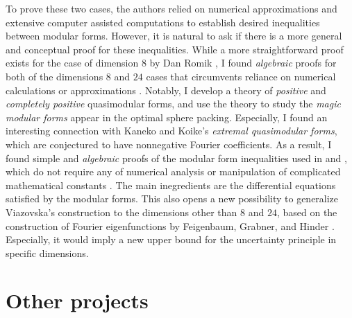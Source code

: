 \documentclass[12pt]{article}
\begin{document}
To prove these two cases, the authors \cite{viazovska2017sphere,cohn2017sphere} relied on numerical approximations and extensive computer assisted computations to establish desired inequalities between modular forms. However, it is natural to ask if there is a more general and conceptual proof for these inequalities.
While a more straightforward proof exists for the case of dimension $8$ by Dan Romik \cite{romik2023viazovska}, I found \emph{algebraic} proofs for both of the dimensions $8$ and $24$ cases that circumvents reliance on numerical calculations or approximations \cite{lee2024algebraic}.
Notably, I develop a theory of \emph{positive} and \emph{completely positive} quasimodular forms, and use the theory to study the \emph{magic modular forms} appear in the optimal sphere packing.
Especially, I found an interesting connection with Kaneko and Koike's \emph{extremal quasimodular forms}, which are conjectured to have nonnegative Fourier coefficients.
As a result, I found simple and \emph{algebraic} proofs of the modular form inequalities used in \cite{viazovska2017sphere} and \cite{cohn2017sphere}, which do not require any of numerical analysis or manipulation of complicated mathematical constants \cite{lee2024algebraic}.
The main inegredients are the differential equations satisfied by the modular forms.
This also opens a new possibility to generalize Viazovska's construction to the dimensions other than $8$ and $24$, based on the construction of Fourier eigenfunctions by Feigenbaum, Grabner, and Hinder \cite{feigenbaum2021eigenfunctions}.
Especially, it would imply a new upper bound for the uncertainty principle \cite{bourgain2010principe} in specific dimensions.




\section*{Other projects}
\end{document}
